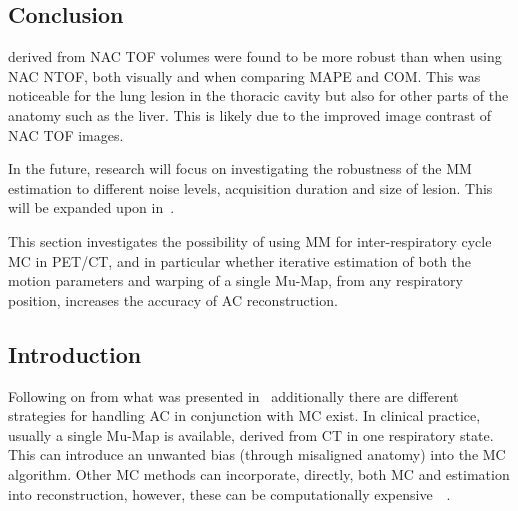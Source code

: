         \subsection{Conclusion} \label{sec:impact_of_tof_on_respiratory_motion_model_estimation_using_pre_gated_no_intra_cycle_motion_nac_pet_conclusion}
             derived from \gls{NAC} \gls{TOF} volumes were found to be more robust than when using \gls{NAC} \gls{NTOF}, both visually and when comparing \gls{MAPE} and \gls{COM}. This was noticeable for the lung lesion in the thoracic cavity but also for other parts of the anatomy such as the liver. This is likely due to the improved image contrast of \gls{NAC} \gls{TOF} images.

            In the future, research will focus on investigating the robustness of the \gls{MM} estimation to different noise levels, acquisition duration and size of lesion. This will be expanded upon in~.
    
        This section investigates the possibility of using \gls{MM} for inter-respiratory cycle \gls{MC} in \gls{PET}/\gls{CT}, and in particular whether iterative estimation of both the motion parameters and warping of a single \gls{Mu-Map}, from any respiratory position, increases the accuracy of \gls{AC} reconstruction.
        
        \subsection{Introduction} \label{sec:pet_ct_respiratory_motion_correction_with_a_single_attenuation_map_using_nac_derived_deformation_fields_introduction}
            Following on from what was presented in~ additionally there are different strategies for handling \gls{AC} in conjunction with \gls{MC} exist. In clinical practice, usually a single \gls{Mu-Map} is available, derived from \gls{CT} in one respiratory state. This can introduce an unwanted bias (through misaligned anatomy) into the \gls{MC} algorithm. Other \gls{MC} methods can incorporate, directly, both \gls{MC} and  estimation into reconstruction, however, these can be computationally expensive~~.
            
